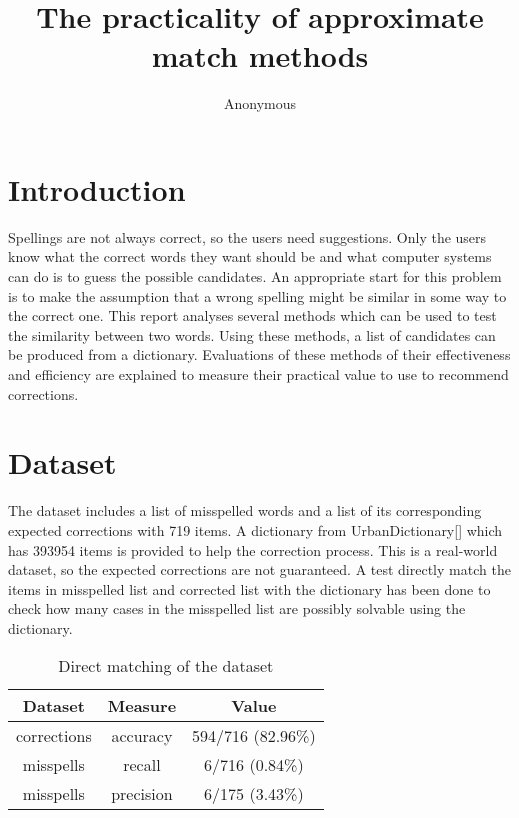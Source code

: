 \documentclass[11pt]{article}
\title{The practicality of approximate match methods
 }
\author
{Anonymous}
\begin{document}
\maketitle

\section{Introduction}

Spellings are not always correct, so the users need suggestions. Only the users know what the correct words they want should be and what computer systems can do is to guess the possible candidates. An appropriate start for this problem is to make the assumption that a wrong spelling might be similar in some way to the correct one. This report analyses several methods which can be used to test the similarity between two words. Using these methods, a list of candidates can be produced from a dictionary. Evaluations of these methods of their effectiveness and efficiency are explained to measure their practical value to use to recommend corrections.

\section{Dataset}

The dataset includes a list of misspelled words and a list of its corresponding expected corrections with 719 items. A dictionary from UrbanDictionary[] which has 393954 items is provided to help the correction process. This is a real-world dataset, so the expected corrections are not guaranteed. A test directly match the items in misspelled list and corrected list with the dictionary has been done to check how many cases in the misspelled list are possibly solvable using the dictionary. 

\begin{table}[h]
 \begin{center}
\begin{tabular}{ |c|c|c| }
      \hline
      Dataset & Measure & Value\\
      \hline\hline
      corrections & accuracy & 594/716 (82.96\%)\\
      misspells & recall & 6/716 (0.84\%)\\
      misspells & precision & 6/175 (3.43\%)\\
      \hline
\end{tabular}
\caption{Direct matching of the dataset}\label{table1}
 \end{center}
\end{table}
\end{document}
